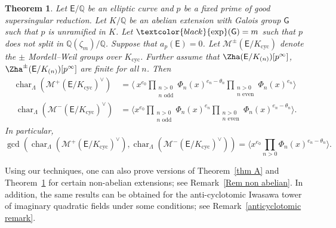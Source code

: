 \documentclass{amsart}
\newcommand{\edit}[1]{\textcolor{black}{#1}}
\numberwithin{equation}{section}
\newtheorem{lthm}{Theorem}
\theoremstyle{remark}
\newcommand{\EC}{\mathsf{E}}
\newcommand{\cM}{\mathcal{M}}
\newcommand{\sG}{\mathsf{G}}
\newcommand{\Q}{\mathbb{Q}}
\newcommand{\cyc}{\operatorname{{cyc}}}
\newcommand{\charac}{\operatorname{char}}
\renewcommand{\exp}{\operatorname{exp}}
\theoremstyle{plain} %
\begin{document}
\begin{lthm}
\label{thm B}
Let $\EC/\Q$ be an elliptic curve and $p$ be a fixed prime of good \emph{supersingular} reduction.
Let $K/\Q$ be an abelian extension with Galois group $\sG$ such that $p$ is unramified in $K$.
Let $\edit{\exp}(\sG) = m$ such that $p$ does not split in $\Q(\zeta_m)/\Q$.
Suppose that $a_p(\EC)=0$.
Let $\cM^{\pm}(\EC/K_{\cyc})$ denote the $\pm$ Mordell--Weil groups over $K_{\cyc}$.
Further assume that $\Zha(\EC/K_{(n)})[p^\infty]$, $\Zha^{\pm}(\EC/K_{(n)})[p^\infty]$ are finite for all $n$.
Then
\begin{align*}
    \charac_{\Lambda}(\cM^{+}(\EC/K_{\cyc})^\vee) & =\Bigg\langle\ x^{e_0} \prod_{\substack{n>0\\ n \text{ odd}}} \Phi_n(x)^{e_n - \theta_n} \prod_{\substack{n>0\\ n \text{ even}}} \Phi_n(x)^{e_n}\Bigg\rangle\\\
     \charac_{\Lambda}(\cM^{-}(\EC/K_{\cyc})^\vee) & = \Bigg\langle x^{e_0} \prod_{\substack{n>0\\ n \text{ odd}}} \Phi_n(x)^{e_n} \prod_{\substack{n>0\\ n \text{ even}}} \Phi_n(x)^{e_n  - \theta_n} \Bigg\rangle.
\end{align*}
In particular,
\[
\gcd\left( \charac_{\Lambda}(\cM^{+}(\EC/K_{\cyc})^\vee), \charac_{\Lambda}(\cM^{-}(\EC/K_{\cyc})^\vee)\right) =\Bigg\langle x^{e_0} \prod_{n>0} \Phi_n(x)^{e_n - \theta_n} \Bigg\rangle.
\]
\end{lthm}

Using our techniques, one can also prove versions of Theorem~\ref{thm A} and Theorem~\ref{thm B} for certain non-abelian extensions; see Remark~\ref{Rem non abelian}.
In addition, the same results can be obtained for the anti-cyclotomic Iwasawa tower of imaginary quadratic fields under some conditions; see Remark~\ref{anticyclotomic remark}.
\end{document}
